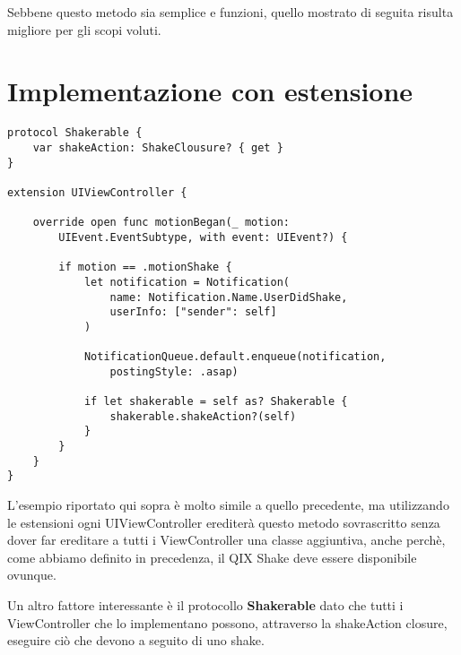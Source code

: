 Sebbene questo metodo sia semplice e funzioni, quello mostrato di seguita
risulta migliore per gli scopi voluti.

\section{Implementazione con estensione}

\begin{verbatim}
protocol Shakerable {
    var shakeAction: ShakeClousure? { get }
}

extension UIViewController {
   
    override open func motionBegan(_ motion:
        UIEvent.EventSubtype, with event: UIEvent?) {

        if motion == .motionShake {
            let notification = Notification(
                name: Notification.Name.UserDidShake,
                userInfo: ["sender": self]
            )
            
            NotificationQueue.default.enqueue(notification,
                postingStyle: .asap)
            
            if let shakerable = self as? Shakerable {
                shakerable.shakeAction?(self)
            }
        }
    }
}
\end{verbatim}

L'esempio riportato qui sopra è molto simile a quello precedente, ma utilizzando le estensioni
ogni UIViewController erediterà questo metodo sovrascritto senza dover far ereditare a tutti i ViewController
una classe aggiuntiva, anche perchè, come abbiamo definito in precedenza, il QIX Shake deve essere disponibile
ovunque. 

Un altro fattore interessante è il protocollo \textbf{Shakerable} dato che tutti i ViewController che lo implementano
possono, attraverso la shakeAction closure, eseguire ciò che devono a seguito di uno shake.